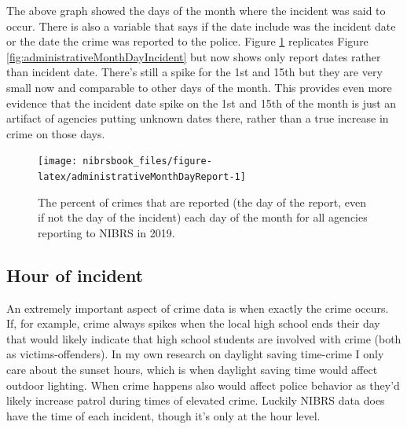 \documentclass[
  12pt,
  openany]{book}
\begin{document}
The above graph showed the days of the month where the incident was said to occur. There is also a variable that says if the date include was the incident date or the date the crime was reported to the police. Figure \ref{fig:administrativeMonthDayReport} replicates Figure \ref{fig:administrativeMonthDayIncident} but now shows only report dates rather than incident date. There's still a spike for the 1st and 15th but they are very small now and comparable to other days of the month. This provides even more evidence that the incident date spike on the 1st and 15th of the month is just an artifact of agencies putting unknown dates there, rather than a true increase in crime on those days.

\begin{figure}

{\centering \texttt{[image: nibrsbook\_files/figure-latex/administrativeMonthDayReport-1]} 

}

\caption{The percent of crimes that are reported (the day of the report, even if not the day of the incident) each day of the month for all agencies reporting to NIBRS in 2019.}\label{fig:administrativeMonthDayReport}
\end{figure}

\hypertarget{hour-of-incident}{%
\subsection{Hour of incident}\label{hour-of-incident}}

An extremely important aspect of crime data is when exactly the crime occurs. If, for example, crime always spikes when the local high school ends their day that would likely indicate that high school students are involved with crime (both as victims-offenders). In my own research on daylight saving time-crime I only care about the sunset hours, which is when daylight saving time would affect outdoor lighting. When crime happens also would affect police behavior as they'd likely increase patrol during times of elevated crime. Luckily NIBRS data does have the time of each incident, though it's only at the hour level.
\end{document}
